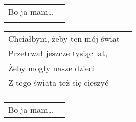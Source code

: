 \documentclass[a5paper]{article}
\begin{document}
\noindent
\begin{tabular}{@{}p{7.00cm}p{3cm}@{}}
Bo ja mam… \\ \\
\end{tabular}

\noindent
\begin{tabular}{@{}p{7.00cm}p{3cm}@{}}
Chciałbym, żeby ten mój świat \\
Przetrwał jeszcze tysiąc lat, \\
Żeby mogły nasze dzieci \\
Z tego świata też się cieszyć \\ \\
\end{tabular}

\noindent
\begin{tabular}{@{}p{7.00cm}p{3cm}@{}}
Bo ja mam…
\end{tabular}
\end{document}
